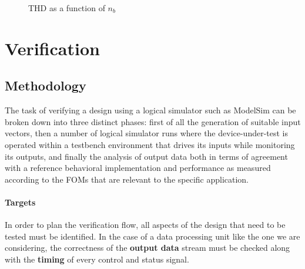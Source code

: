 \begin{figure}
	\caption{THD as a function of $n_b$}
	\label{fig:thdplot}
\end{figure}

\section{Verification}
\subsection{Methodology}
The task of verifying a design using a logical simulator such as ModelSim can be broken down into three distinct phases: first of all the generation of suitable input vectors, then a number of logical simulator runs where the device-under-test is operated within a testbench environment that drives its inputs while monitoring its outputs, and finally the analysis of output data both in terms of agreement with a reference behavioral implementation and performance as measured according to the FOMs that are relevant to the specific application.

\paragraph{Targets} In order to plan the verification flow, all aspects of the design that need to be tested must be identified. In the case of a data processing unit like the one we are considering, the correctness of the \textbf{output data} stream must be checked along with the \textbf{timing} of every control and status signal.

